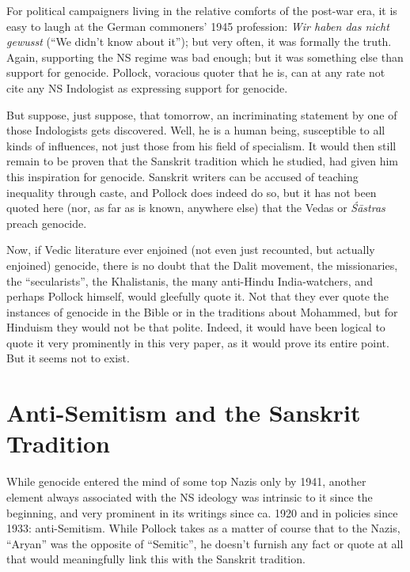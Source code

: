 For political campaigners living in the relative comforts of the post-war era, it is easy to laugh at the German commoners’ 1945 profession: {\sl Wir haben das nicht gewusst} (“We didn’t know about it”); but very often, it was formally the truth. Again, supporting the NS regime was bad enough; but it was something else than support for genocide. Pollock, voracious quoter that he is, can at any rate not cite any NS Indologist as expressing support for genocide.

But suppose, just suppose, that tomorrow, an incriminating statement by one of those Indologists gets discovered. Well, he is a human being, susceptible to all kinds of influences, not just those from his field of specialism. It would then still remain to be proven that the Sanskrit tradition which he studied, had given him this inspiration for genocide. Sanskrit writers can be accused of teaching inequality through caste, and Pollock does indeed do so, but it has not been quoted here (nor, as far as is known, anywhere else) that the Vedas or {\sl Śāstras} preach genocide.

Now, if Vedic literature ever enjoined (not even just recounted, but actually enjoined) genocide, there is no doubt that the Dalit movement, the missionaries, the “secularists”, the Khalistanis, the many anti-Hindu India-watchers, and perhaps Pollock himself, would gleefully quote it. Not that they ever quote the instances of genocide in the Bible or in the traditions about Mohammed, but for Hinduism they would not be that polite. Indeed, it would have been logical to quote it very prominently in this very paper, as it would prove its entire point. But it seems not to exist.

\section*{Anti-Semitism and the Sanskrit Tradition}

While genocide entered the mind of some top Nazis only by 1941, another element always associated with the NS ideology was intrinsic to it since the beginning, and very prominent in its writings since ca. 1920 and in policies since 1933: anti-Semitism. While Pollock takes as a matter of course that to the Nazis, “Aryan” was the opposite of “Semitic”, he doesn’t furnish any fact or quote at all that would meaningfully link this with the Sanskrit tradition.


